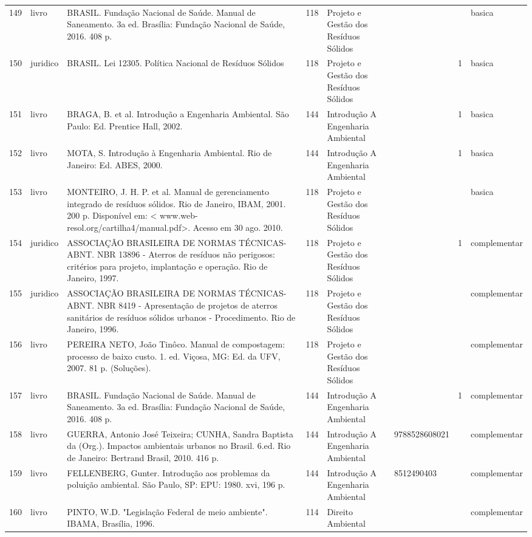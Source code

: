 \documentclass[12pt,a4paper,twoside]{report}
\begin{document}
\begin{longtable}{l|l|p{4cm}|l|p{3cm}|p{3cm}|l|l}
149&livro&BRASIL. Fundação Nacional de Saúde. Manual de Saneamento. 3a ed. Brasília: Fundação Nacional de Saúde, 2016. 408 p.&118&Projeto e Gestão dos Resíduos Sólidos&&&basica\\
150&juridico&BRASIL. Lei 12305. Política Nacional de Resíduos Sólidos&118&Projeto e Gestão dos Resíduos Sólidos&&1&basica\\
151&livro&BRAGA, B. et al. Introdução a Engenharia Ambiental. São Paulo: Ed. Prentice Hall, 2002.&144&Introdução A Engenharia Ambiental&&1&basica\\
152&livro&MOTA, S. Introdução à Engenharia Ambiental. Rio de Janeiro: Ed. ABES, 2000.&144&Introdução A Engenharia Ambiental&&1&basica\\
153&livro&MONTEIRO, J. H. P. et al. Manual de gerenciamento integrado de resíduos sólidos. Rio de Janeiro, IBAM, 2001. 200 p. Disponível em: < www.web-resol.org/cartilha4/manual.pdf>. Acesso em 30 ago. 2010.&118&Projeto e Gestão dos Resíduos Sólidos&&&basica\\
154&juridico&ASSOCIAÇÃO BRASILEIRA DE NORMAS TÉCNICAS-ABNT. NBR 13896 - Aterros de resíduos não perigosos: critérios para projeto, implantação e operação. Rio de Janeiro, 1997.&118&Projeto e Gestão dos Resíduos Sólidos&&1&complementar\\
155&juridico&ASSOCIAÇÃO BRASILEIRA DE NORMAS TÉCNICAS-ABNT. NBR 8419 - Apresentação de projetos de aterros sanitários de resíduos sólidos urbanos - Procedimento. Rio de Janeiro, 1996.&118&Projeto e Gestão dos Resíduos Sólidos&&&complementar\\
156&livro&PEREIRA NETO, João Tinôco. Manual de compostagem: processo de baixo custo. 1. ed. Viçosa, MG: Ed. da UFV, 2007. 81 p. (Soluções).&118&Projeto e Gestão dos Resíduos Sólidos&&&complementar\\
157&livro&BRASIL. Fundação Nacional de Saúde. Manual de Saneamento. 3a ed. Brasília: Fundação Nacional de Saúde, 2016. 408 p.&144&Introdução A Engenharia Ambiental&&1&complementar\\
158&livro&GUERRA, Antonio José Teixeira; CUNHA, Sandra Baptista da (Org.). Impactos ambientais urbanos no Brasil. 6.ed. Rio de Janeiro: Bertrand Brasil, 2010. 416 p.&144&Introdução A Engenharia Ambiental&9788528608021&&complementar\\
159&livro&FELLENBERG, Gunter. Introdução aos problemas da poluição ambiental. São Paulo, SP: EPU: 1980. xvi, 196 p.&144&Introdução A Engenharia Ambiental&8512490403&&complementar\\
160&livro&PINTO, W.D. "Legislação Federal de meio ambiente". IBAMA, Brasília, 1996.&114&Direito Ambiental&&&complementar\\

\end{longtable}
\end{document}
